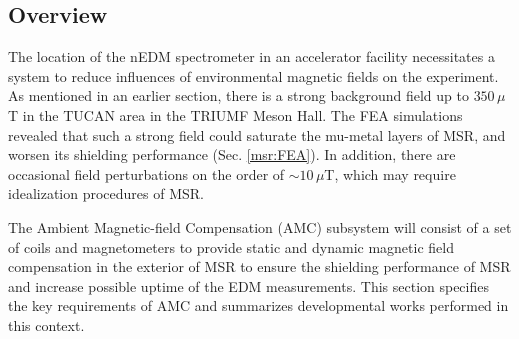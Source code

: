 \subsection{Overview}
The location of the nEDM spectrometer in an accelerator facility necessitates a system to reduce influences of environmental magnetic fields on the experiment. As mentioned in an earlier section, there is a strong background field up to $350\,\mu$T in the TUCAN area in the TRIUMF Meson Hall. The FEA simulations revealed that such a strong field could saturate the mu-metal layers of MSR, and worsen its shielding performance (Sec. \ref{msr:FEA}). In addition, there are occasional field perturbations on the order of $\sim 10\,\mu$T, which may require idealization procedures of MSR. 

The Ambient Magnetic-field Compensation (AMC) subsystem will consist of a set of coils and magnetometers to provide static and dynamic magnetic field compensation in the exterior of MSR to ensure the shielding performance of MSR and increase possible uptime of the EDM measurements. This section specifies the key requirements of  AMC and summarizes developmental works performed in this context.  





